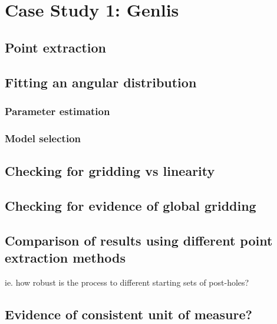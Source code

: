 \documentclass[../../ArchStats.tex]{subfiles}
\begin{document}
\section{Case Study 1: Genlis}
\label{sec:CS1}

\subsection{Point extraction}

\subsection{Fitting an angular distribution}

\subsubsection{Parameter estimation}
\subsubsection{Model selection}

\subsection{Checking for gridding vs linearity}

\subsection{Checking for evidence of global gridding}

\subsection{Comparison of results using different point extraction methods}
ie. how robust is the process to different starting sets of post-holes?

\subsection{Evidence of consistent unit of measure?}
\end{document}

